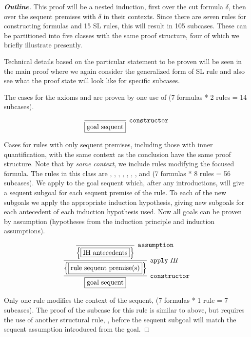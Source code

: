 \begin{proof}[\textbf{Outline}]

This proof will be a nested induction, first over the cut formula $\delta$, then over the sequent premises with $\delta$ in their contexts. Since there are seven rules for constructing formulas and 15 SL rules, this will result in 105 subcases. These can be partitioned into five classes with the same proof structure, four of which we briefly illustrate presently.

Technical details based on the particular statement to be proven will be seen in the main proof where we again consider the generalized form of SL rule and also see what the proof state will look like for specific subcases.



The cases for the axioms \rlnmst{} and \rlnmbmatch{} are proven by one use of  (7 formulas * 2 rules = 14 subcases).

{\small
$$
\infer[\coqtm{constructor}]{\fbox{goal sequent}}{}
$$
}

Cases for rules with only sequent premises, including those with inner quantification, with the same context as the conclusion have the same proof structure. Note that by \emph{same context}, we include rules modifying the focused formula. The rules in this class are \rlnmsand{}, \rlnmsall{}, \rlnmsalls{}, \rlnmbanda{}, \rlnmbandb{}, \rlnmbimp{}, \rlnmballs{}, and \rlnmbsome{} (7 formulas * 8 rules = 56 subcases). We apply  to the goal sequent which, after any introductions, will give a sequent subgoal for each sequent premise of the rule. To each of the new subgoals we apply the appropriate induction hypothesis, giving new subgoals for each antecedent of each induction hypothesis used. Now all goals can be proven by assumption (hypotheses from the induction principle and induction assumptions).

{\small
$$
\infer[\coqtm{constructor}]{\fbox{goal sequent}}{
	\infer[\coqtm{apply} \; \mathit{IH}]{\Big\{ \fbox{rule sequent premise(s)} \Big\}}{
	    \infer[\coqtm{assumption}]{\Big\{ \fbox{IH antecedents} \Big\}}{}
	}
}
$$
}

Only one rule modifies the context of the sequent, \rlnmsimp{} (7 formulas * 1 rule = 7 subcases). The proof of the subcase for this rule is similar to above, but requires the use of another structural rule, , before the sequent subgoal will match the sequent assumption introduced from the goal.


\end{proof}
